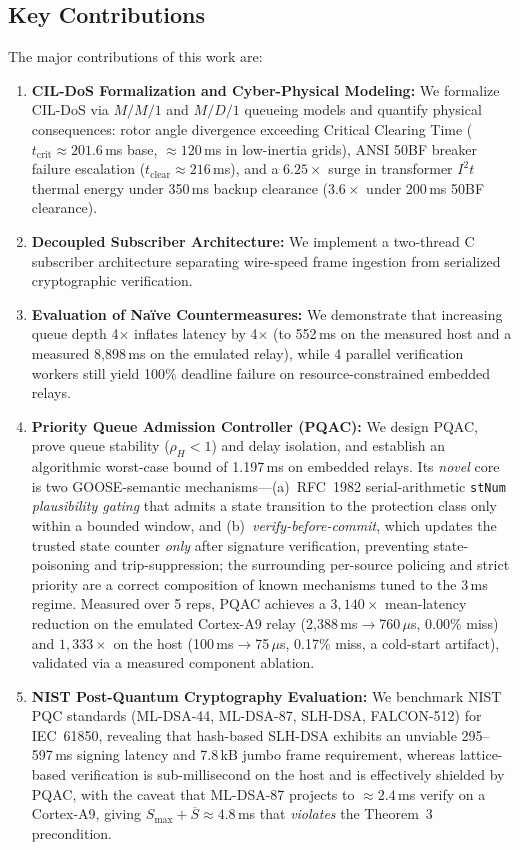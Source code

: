 \documentclass[journal]{IEEEtran}
\begin{document}
\subsection{Key Contributions}
The major contributions of this work are:
\begin{enumerate}[leftmargin=*,noitemsep,topsep=1pt]
    \item \textbf{CIL-DoS Formalization and Cyber-Physical Modeling:} We formalize CIL-DoS via $M/M/1$ and $M/D/1$ queueing models and quantify physical consequences: rotor angle divergence exceeding Critical Clearing Time ($t_{\text{crit}} \approx 201.6$\,ms base, $\approx 120$\,ms in low-inertia grids), ANSI 50BF breaker failure escalation ($t_{\text{clear}} \approx 216$\,ms), and a $6.25\times$ surge in transformer $I^2 t$ thermal energy under 350\,ms backup clearance ($3.6\times$ under 200\,ms 50BF clearance).
    \item \textbf{Decoupled Subscriber Architecture:} We implement a two-thread C subscriber architecture separating wire-speed frame ingestion from serialized cryptographic verification.
    \item \textbf{Evaluation of Na\"ive Countermeasures:} We demonstrate that increasing queue depth 4$\times$ inflates latency by 4$\times$ (to 552\,ms on the measured host and a measured 8,898\,ms on the emulated relay), while 4 parallel verification workers still yield 100\% deadline failure on resource-constrained embedded relays.
    \item \textbf{Priority Queue Admission Controller (PQAC):} We design PQAC, prove queue stability ($\rho_H < 1$) and delay isolation, and establish an algorithmic worst-case bound of 1.197\,ms on embedded relays. Its \emph{novel} core is two GOOSE-semantic mechanisms---(a)~RFC~1982 serial-arithmetic \texttt{stNum} \emph{plausibility gating} that admits a state transition to the protection class only within a bounded window, and (b)~\emph{verify-before-commit}, which updates the trusted state counter \emph{only} after signature verification, preventing state-poisoning and trip-suppression; the surrounding per-source policing and strict priority are a correct composition of known mechanisms tuned to the 3\,ms regime. Measured over 5 reps, PQAC achieves a $3{,}140\times$ mean-latency reduction on the emulated Cortex-A9 relay (2{,}388\,ms$\to$760\,$\mu$s, 0.00\% miss) and $1{,}333\times$ on the host (100\,ms$\to$75\,$\mu$s, 0.17\% miss, a cold-start artifact), validated via a measured component ablation.
    \item \textbf{NIST Post-Quantum Cryptography Evaluation:} We benchmark NIST PQC standards (ML-DSA-44, ML-DSA-87, SLH-DSA, FALCON-512) for IEC~61850, revealing that hash-based SLH-DSA exhibits an unviable 295--597\,ms signing latency and 7.8\,kB jumbo frame requirement, whereas lattice-based verification is sub-millisecond on the host and is effectively shielded by PQAC, with the caveat that ML-DSA-87 projects to $\approx 2.4$\,ms verify on a Cortex-A9, giving $S_{\max}+\overline{S}\approx 4.8$\,ms that \emph{violates} the Theorem~3 precondition.

\end{enumerate}
\end{document}
